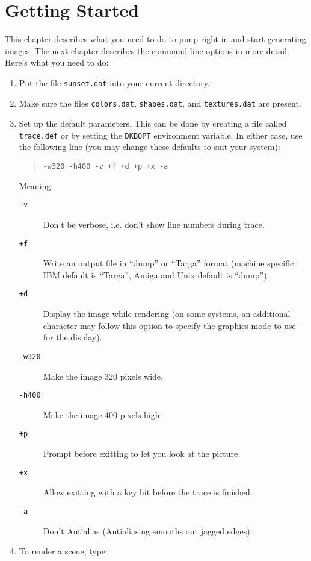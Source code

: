 \chapter{Getting Started}

This chapter describes what you need to do to jump right in and start
generating images. The next chapter describes the command-line options
in more detail. Here's what you need to do:

\begin{enumerate}
\item Put the file {\tt sunset.dat} into your current directory.
\item Make sure the files {\tt colors.dat}, {\tt shapes.dat}, and
{\tt textures.dat} are present.
\item Set up the default parameters.  This can be done by creating a file
called {\tt trace.def}
or by setting the
{\tt DKBOPT}
environment variable.
In either case, use the following line (you may change these defaults
to suit your system):
\begin{quote}
{\tt -w320 -h400 -v +f +d +p +x -a}
\end{quote}
Meaning:
\begin{description}
\item[{\tt -v}] Don't be verbose, i.e. don't show
line numbers during trace.
\item[{\tt +f}] Write an output file in ``dump'' or ``Targa'' format (machine
specific; IBM default is ``Targa'', Amiga and Unix
default is ``dump'').
\item[{\tt +d}] Display the image while rendering
(on some systems, an
additional character may follow this option to specify the
graphics mode to use for the display).
\item[{\tt -w320}] Make the image 320 pixels wide.
\item[{\tt -h400}]  Make the image 400 pixels high.
\item[{\tt +p}]  Prompt before exitting to let you look at the picture.
\item[{\tt +x}]  Allow exitting with a key hit before the trace is finished.
\item[{\tt -a}]  Don't Antialias (Antialiasing smooths out jagged edges).
\end{description}
\item To render a scene, type:

\end{enumerate}
